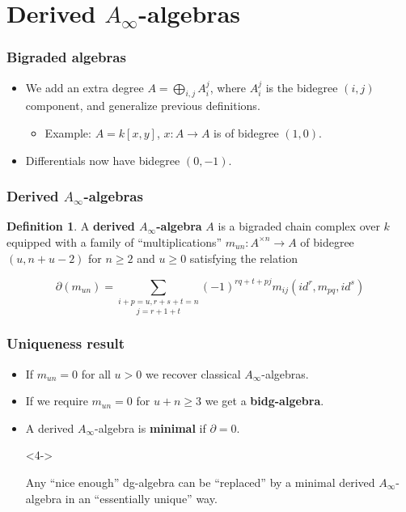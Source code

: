 \documentclass{beamer}
\theoremstyle{definition}
\newtheorem{defi}{Definition}
\begin{document}
\section{Derived $A_\infty$-algebras}

\begin{frame}
\frametitle{Bigraded algebras}
\begin{itemize}
\item We add an extra degree $A=\bigoplus_{i,j} A_i^j$, where $A_i^j$ is the bidegree $(i,j)$ component, and generalize previous definitions.
\begin{itemize}
\item<2-> Example: $A=k[x,y]$, $x:A\to A$ is of bidegree $(1,0)$.
\end{itemize}
\item<3-> Differentials now have bidegree $(0,-1)$. 
\end{itemize}
\end{frame}

\begin{frame}
\frametitle{Derived $A_\infty$-algebras}
\begin{defi}
A \textbf{derived $A_\infty$-algebra} $A$ is a bigraded  chain complex over $k$ equipped with a family of ``multiplications'' $m_{un}:A^{\times n}\to A$ of bidegree $(u,n+u-2)$ for $n\geq 2$ and $u\geq 0$ satisfying the relation

\[\partial(m_{un})=\underset{j=r+1+t}{\sum_{i+p=u,r+s+t=n}}(-1)^{rq+t+pj}m_{ij}(id^{ r}, m_{pq}, id^{ s})\] %
\end{defi}
\end{frame}


\begin{frame}
\frametitle{Uniqueness result}
\begin{itemize}
\item If $m_{un}=0$ for all $u>0$ we recover classical $A_\infty$-algebras.
\item<2-> If we require $m_{un}=0$ for $u+n\geq 3$ we get a \textbf{bidg-algebra}. %
\item<3-> A derived $A_\infty$-algebra is \textbf{minimal} if $\partial=0$. 
\item[]<4->
\begin{theorem}[Sagave]
Any ``nice enough'' dg-algebra can be ``replaced'' by a minimal derived $A_\infty$-algebra in an ``essentially unique'' way.
\end{theorem}
\end{itemize}
\end{frame}
\end{document}

